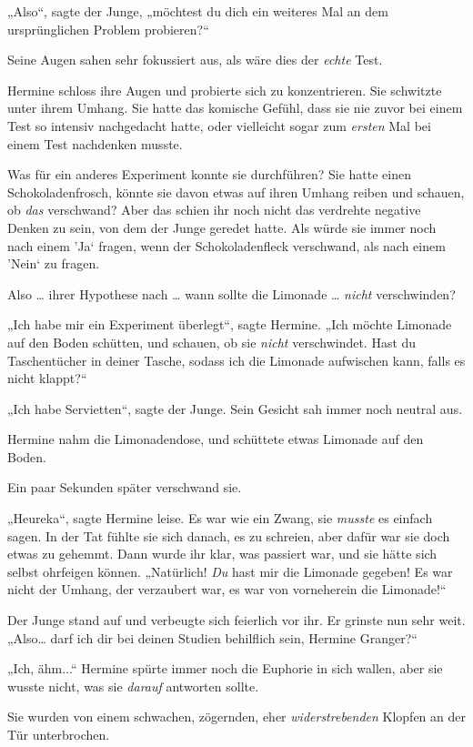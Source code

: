 „Also“, sagte der Junge, „möchtest du dich ein weiteres Mal an dem ursprünglichen Problem probieren?“ 

Seine Augen sahen sehr fokussiert aus, als wäre dies der \emph{echte} Test. 

Hermine schloss ihre Augen und probierte sich zu konzentrieren. Sie schwitzte unter ihrem Umhang. Sie hatte das komische Gefühl, dass sie nie zuvor bei einem Test so intensiv nachgedacht hatte, oder vielleicht sogar zum \emph{ersten} Mal bei einem Test nachdenken musste. 

Was für ein anderes Experiment konnte sie durchführen? Sie hatte einen Schokoladenfrosch, könnte sie davon etwas auf ihren Umhang reiben und schauen, ob \emph{das} verschwand? Aber das schien ihr noch nicht das verdrehte negative Denken zu sein, von dem der Junge geredet hatte. Als würde sie immer noch nach einem ’Ja‘ fragen, wenn der Schokoladenfleck verschwand, als nach einem ’Nein‘ zu fragen. 

Also … ihrer Hypothese nach … wann sollte die Limonade … \emph{nicht} verschwinden? 

„Ich habe mir ein Experiment überlegt“, sagte Hermine. „Ich möchte Limonade auf den Boden schütten, und schauen, ob sie \emph{nicht} verschwindet. Hast du Taschentücher in deiner Tasche, sodass ich die Limonade aufwischen kann, falls es nicht klappt?“ 

„Ich habe Servietten“, sagte der Junge. Sein Gesicht sah immer noch neutral aus. 

Hermine nahm die Limonadendose, und schüttete etwas Limonade auf den Boden. 

Ein paar Sekunden später verschwand sie. 

„Heureka“, sagte Hermine leise. Es war wie ein Zwang, sie \emph{musste} es einfach sagen. In der Tat fühlte sie sich danach, es zu schreien, aber dafür war sie doch etwas zu gehemmt. Dann wurde ihr klar, was passiert war, und sie hätte sich selbst ohrfeigen können. „Natürlich! \emph{Du} hast mir die Limonade gegeben! Es war nicht der Umhang, der verzaubert war, es war von vorneherein die Limonade!“ 

Der Junge stand auf und verbeugte sich feierlich vor ihr. Er grinste nun sehr weit. „Also… darf ich dir bei deinen Studien behilflich sein, Hermine Granger?“ 

„Ich, ähm...“ Hermine spürte immer noch die Euphorie in sich wallen, aber sie wusste nicht, was sie \emph{darauf} antworten sollte. 

Sie wurden von einem schwachen, zögernden, eher \emph{widerstrebenden} Klopfen an der Tür unterbrochen. 

